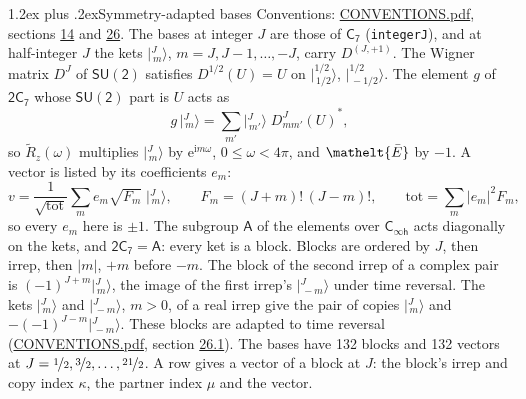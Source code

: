 \documentclass[10pt,a4paper]{article}
\makeatletter
\renewcommand\section{\@startsection{section}{1}{\z@}{-3ex plus -1ex minus -.2ex}%
  {1.2ex plus .2ex}{\normalfont\large\sffamily\bfseries\color{parttitle}}}
\numberwithin{equation}{section}
\newcommand{\eltfont}[1]{{\let\sigma\eltsigma\mathelt{#1}}}
\newcommand{\grp}[1]{\mathsf{#1}}
\newcommand{\elt}[1]{\eltfont{#1}}
\newcommand{\iunit}{\mathrm{i}}
\newcommand{\expe}{\mathrm{e}}
\newcommand{\irrJp}[2]{D^{(#1,#2)}}
\newcommand{\wignerD}[1]{D^{#1}}
\newcommand{\conj}[1]{{#1}^{*}}
\newcommand{\mult}{\kappa}
\newcommand{\intx}{\mu}
\newcommand{\jm}[2]{\bigl\lvert{}^{#1}_{\,#2}\bigr\rangle}
\newcommand{\barred}[1]{\bar{#1}}
\newcommand{\lift}[1]{\tilde{#1}}
\makeatother
\begin{document}
\section{Symmetry-adapted bases}\label{s:bases}
Conventions: \href{../../CONVENTIONS.pdf}{CONVENTIONS.pdf}, sections \href{../../../rotation/CONVENTIONS.pdf\#conv.14}{14} and \href{../../CONVENTIONS.pdf\#conv.26}{26}.
\leavevmode\label{n:index.m}\label{n:vector.ket}The bases at integer $J$ are those of \href{../../../rotation/data/pdf/C7.pdf}{$\grp{C_{7}}$} (\texttt{integerJ}), and at half-integer $J$ the kets $\jm{J}{m}$, $m = J, J-1, \dots, -J$, carry $\irrJp{J}{+1}$. \label{n:matrix.wigner}The Wigner matrix $\wignerD{J}$ of $\grp{SU(2)}$ satisfies $\wignerD{1/2}(U) = U$ on $\jm{1/2}{1/2}$, $\jm{1/2}{-1/2}$. The element $g$ of $\grp{2C_{7}}$ whose $\grp{SU(2)}$ part is $U$ acts as
\begin{equation}\label{e:action}g\,\jm{J}{m} = \sum_{m'} \jm{J}{m'}\; \conj{\wignerD{J}_{m m'}(U)},\end{equation}
so $\lift{R}_{z}(\omega)$ multiplies $\jm{J}{m}$ by $\expe^{\iunit m\omega}$, $0 \le \omega < 4\pi$, and $\elt{\barred{E}}$ by $-1$. \label{n:index.ketcoefficient}\label{n:vector.basis.symmetry}\label{n:index.ketweight}\label{n:index.total}A vector is listed by its coefficients $e_m$:
\begin{equation}\label{e:ket}v = \frac{1}{\sqrt{\mathrm{tot}}}\sum_m e_m\sqrt{F_m}\;\jm{J}{m},\qquad F_m = (J+m)!\,(J-m)!,\qquad \mathrm{tot} = \sum_m |e_m|^2F_m,\end{equation}
so every $e_m$ here is $\pm 1$.
\leavevmode\label{n:group.A}The subgroup $\grp{A}$ of the elements over $\grp{C_{\infty h}}$ acts diagonally on the kets, and $\grp{2C_{7}} = \grp{A}$: every ket is a block. Blocks are ordered by $J$, then irrep, then $|m|$, $+m$ before $-m$. The block of the second irrep of a complex pair is $(-1)^{J+m}\jm{J}{m}$, the image of the first irrep's $\jm{J}{-m}$ under time reversal. The kets $\jm{J}{m}$ and $\jm{J}{-m}$, $m > 0$, of a real irrep give the pair of copies $\jm{J}{m}$ and $-(-1)^{J-m}\jm{J}{-m}$. These blocks are adapted to time reversal (\href{../../CONVENTIONS.pdf}{CONVENTIONS.pdf}, section \href{../../CONVENTIONS.pdf\#conv.26.1}{26.1}).
The bases have 132 blocks and 132 vectors at $J = \nicefrac{1}{2}, \nicefrac{3}{2}, \dots, \nicefrac{21}{2}$. \label{n:index.copy}\label{n:head.vector}A row gives a vector of a block at $J$: the block's irrep and copy index $\mult$, the partner index $\intx$ and the vector.
\end{document}

